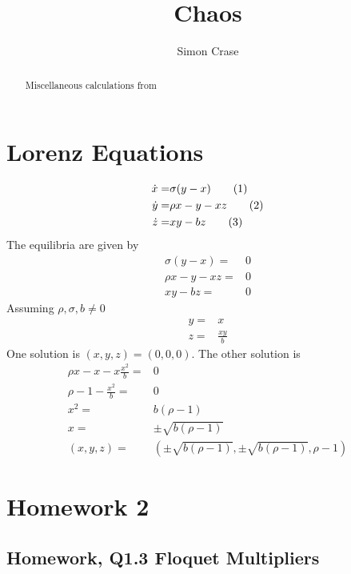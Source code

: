 \documentclass[]{article}
\title{Chaos}
\author{Simon Crase}
\newcommand\numberthis{\addtocounter{equation}{1}\tag{\theequation}}
\begin{document}
\maketitle

\begin{abstract}
Miscellaneous calculations  from \cite{ChaosBook}
\end{abstract}

\section{Lorenz Equations}

\begin{align*}
	\dot{x} =& \sigma(y-x) \numberthis \label{eq:lorenz:1}\\
	\dot{y} =& \rho x -y - xz \numberthis \label{eq:lorenz:2}\\
	\dot{z} =& xy-bz \numberthis \label{eq:lorenz:3}
\end{align*}
The equilibria are given by
\begin{align*}
	\sigma(y-x) =& 0\\
	\rho x -y - xz  =& 0\\
	xy-bz =& 0
\end{align*}
Assuming $\rho, \sigma, b \ne 0$
\begin{align*}
	y =& x\\
	z =& \frac{xy}{b}
\end{align*}
One solution is $(x,y,z)= (0,0,0)$. The other solution is
\begin{align*}
	\rho x - x-x \frac{x^2}{b} =& 0\\
	\rho -1 - \frac {x^2}{b} =& 0\\
	x^2 =& b(\rho-1)\\
	x =& \pm \sqrt{ b(\rho-1)}\\
	(x,y,z)=& (\pm \sqrt{ b(\rho-1)},\pm \sqrt{ b(\rho-1)},\rho-1)
\end{align*}
\section{Homework 2}

\subsection{Homework, Q1.3 Floquet Multipliers}
\end{document}
